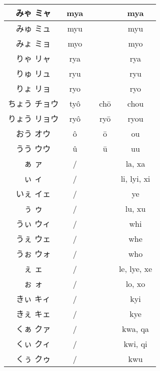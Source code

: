\documentclass{article}
\begin{document}
\begin{center}
\begin{japanese}
\begin{longtable}{|c|c c c|c|}
                みゃ ミャ & mya &&& mya \\ \hline
                みゅ ミュ & myu &&& myu \\ \hline
                みょ ミョ & myo &&& myo \\ \hline
                りゃ リャ & rya &&& rya \\ \hline
                りゅ リュ & ryu &&& ryu \\ \hline
                りょ リョ & ryo &&& ryo \\ \hline
                ちょう チョウ & tyô && chō & chou \\ \hline
                りょう リョウ & ryô && ryō & ryou \\ \hline
                おう オウ & ô && ō & ou \\ \hline
                うう ウウ & û && ū & uu \\ \hline
                ぁ ァ & / &&& la, xa \\ \hline
                ぃ ィ & / &&& li, lyi, xi \\ \hline
                いぇ イェ & / &&& ye \\ \hline
                ぅ ゥ & / &&& lu, xu \\ \hline
                うぃ ウィ & / &&& whi \\ \hline
                うぇ ウェ & / &&& whe \\ \hline
                うぉ ウォ & / &&& who \\ \hline
                ぇ ェ & / &&& le, lye, xe \\ \hline
                ぉ ォ & / &&& lo, xo \\ \hline
                きぃ キィ & / &&& kyi \\ \hline
                きぇ キェ & / &&& kye \\ \hline
                くぁ クァ & / &&& kwa, qa \\ \hline
                くぃ クィ & / &&& kwi, qi \\ \hline
                くぅ クゥ & / &&& kwu \\ \hline

\end{longtable}
\end{japanese}
\end{center}
\end{document}
